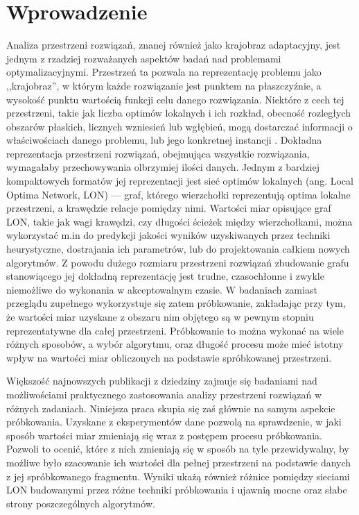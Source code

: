 \chapter{Wprowadzenie}

Analiza przestrzeni rozwiązań, znanej również jako krajobraz adaptacyjny, jest jednym z rzadziej rozważanych aspektów badań nad problemami optymalizacyjnymi.
Przestrzeń ta pozwala na reprezentację problemu jako ,,krajobraz'', w którym każde rozwiązanie jest punktem na płaszczyźnie, a wysokość punktu wartością funkcji celu
danego rozwiązania.
Niektóre z cech tej przestrzeni, takie jak liczba optimów lokalnych i ich rozkład, obecność rozległych obszarów płaskich,
licznych wzniesień lub wgłębień, mogą dostarczać informacji o właściwościach danego problemu, lub jego konkretnej instancji \cite{DBLP:journals/corr/OchoaVDT14}.
Dokładna reprezentacja przestrzeni rozwiązań, obejmująca wszystkie rozwiązania,
wymagałaby przechowywania olbrzymiej ilości danych.
Jednym z bardziej kompaktowych formatów jej reprezentacji jest sieć optimów lokalnych (ang. Local Optima Network, LON) --- graf, którego wierzchołki reprezentują
optima lokalne przestrzeni, a krawędzie relacje pomiędzy nimi.
Wartości miar opisujące graf LON, takie jak wagi krawędzi, czy długości ścieżek między wierzchołkami, można wykorzystać
m.in do predykcji jakości wyników uzyskiwanych przez techniki heurystyczne, dostrajania ich parametrów, lub do projektowania całkiem nowych algorytmów.
Z powodu dużego rozmiaru przestrzeni rozwiązań zbudowanie grafu stanowiącego jej dokładną reprezentację jest trudne, czasochłonne i zwykle niemożliwe
do wykonania w akceptowalnym czasie.
W badaniach zamiast przeglądu zupełnego wykorzystuje się zatem próbkowanie, zakładając przy tym, że wartości miar uzyskane z obszaru nim objętego
są w pewnym stopniu reprezentatywne dla całej przestrzeni. Próbkowanie to można wykonać na wiele różnych sposobów,
a wybór algorytmu, oraz długość procesu może mieć istotny wpływ na wartości miar obliczonych na podstawie spróbkowanej przestrzeni.

Większość najnowszych publikacji z dziedziny zajmuje się badaniami nad możliwościami praktycznego zastosowania analizy przestrzeni rozwiązań w różnych zadaniach.
Niniejsza praca skupia się zaś głównie na samym aspekcie próbkowania.
Uzyskane z eksperymentów dane pozwolą na sprawdzenie, w jaki sposób wartości miar zmieniają się wraz z postępem procesu próbkowania.
Pozwoli to ocenić, które z nich zmieniają się w sposób na tyle przewidywalny, by możliwe było szacowanie ich wartości dla pełnej przestrzeni na podstawie danych z jej spróbkowanego fragmentu.
Wyniki ukażą również różnice pomiędzy sieciami LON budowanymi przez różne techniki próbkowania i ujawnią mocne oraz słabe strony poszczególnych algorytmów.

